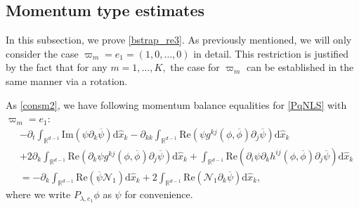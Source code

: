 \documentclass[10pt,twoside,a4paper]{article}
\numberwithin{equation}{section}\allowdisplaybreaks
\begin{document}
\subsection{Momentum type estimates} \label{s_big.1}
In this subsection, we prove \eqref{bstrap_re3}. As previously mentioned, we will only consider the case $\varpi_m=e_1=(1, 0, \dots, 0) $ in detail. This restriction is justified by the fact that  for any $m=1,\dots, K,$ the case for  $\varpi_m$ can be established in the same manner via a rotation.

As \eqref{consm2}, we have following momentum balance equalities  for \eqref{PqNLS} with $\varpi_m=e_1$:
\begin{align} \label{big_consm2}
	&	-\partial_t \int_{\mathbb{R}^{d-1}}  \mathrm{Im}\left( \psi \partial_k \overline{\psi}\right) \mathrm{d} \hat{x}_k-\partial_{kk} \int_{\mathbb{R}^{d-1}} \mathrm{Re}\left( \psi   g^{kj}(\phi,\overline{\phi}) \partial_j \overline{\psi}\right) \mathrm{d} \hat{x}_k\nonumber\\
	&+2 \partial_k \int_{\mathbb{R}^{d-1}} \mathrm{Re}\left(\partial_k \psi  g^{kj}(\phi,\overline{\phi}) \partial_j \overline{\psi}\right) \mathrm{d} \hat{x}_k + \int_{\mathbb{R}^{d-1}}  \mathrm{Re}\left(\partial_{i} \psi  \partial_k h^{ij}(\phi,\overline{\phi}) \partial_j \overline{\psi}\right)  \mathrm{d} \hat{x}_k \\
	&=- \partial_k\int_{\mathbb{R}^{d-1}}   \mathrm{Re}\left(  \overline{\psi} \mathcal{N}_1\right)\mathrm{d} \hat{x}_k+2\int_{\mathbb{R}^{d-1}} \mathrm{Re} \left(\mathcal{N}_1 \partial_k  \overline{\psi}\right)   \mathrm{d} \hat{x}_k \nonumber,
\end{align}
where we write $P_{\lambda,e_1} \phi $ as $  \psi $ for convenience.
\end{document}
